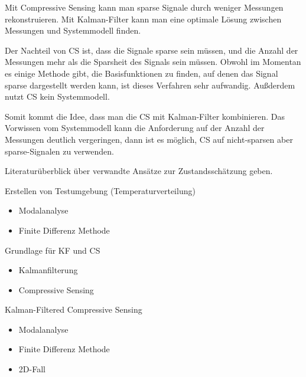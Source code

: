 \documentclass [a4paper, 10pt]{scrartcl}
\begin{document}
\Anfang

Mit Compressive Sensing kann man sparse Signale durch weniger Messungen rekonstruieren. Mit Kalman-Filter kann man eine optimale Lösung zwischen Messungen und Systemmodell finden.

Der Nachteil von CS ist, dass die Signale sparse sein müssen, und die Anzahl der Messungen mehr als die Sparsheit des Signals sein müssen. Obwohl im Momentan es einige Methode gibt, die Basisfunktionen zu finden, auf denen das Signal sparse dargestellt werden kann, ist dieses Verfahren sehr aufwandig. Außderdem nutzt CS kein Systemmodell.

Somit kommt die Idee, dass man die CS mit Kalman-Filter kombinieren. Das Vorwissen vom Systemmodell kann die Anforderung auf der Anzahl der Messungen deutlich vergeringen, dann ist es möglich, CS auf nicht-sparsen aber sparse-Signalen zu verwenden.


\begin{aufgaben}
\item Literaturüberblick über verwandte Ansätze zur Zustandsschätzung geben.
\item Erstellen von Testumgebung (Temperaturverteilung)
  \begin{itemize}
  \item Modalanalyse
  \item Finite Differenz Methode
  \end{itemize}
\item Grundlage für KF und CS
  \begin{itemize}
  \item Kalmanfilterung
  \item Compressive Sensing
  \end{itemize}
\item Kalman-Filtered Compressive Sensing
  \begin{itemize}
  \item Modalanalyse
  \item Finite Differenz Methode
  \item 2D-Fall
  \end{itemize}
\end{aufgaben}%
\Ende
\end{document}
